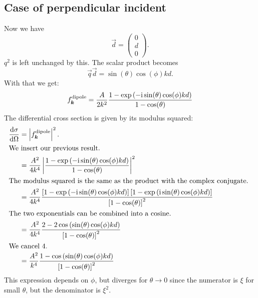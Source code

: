 \documentclass[11pt, english, fleqn, DIV=15, headinclude, BCOR=1.5cm]{scrartcl}
\begin{document}
\subsection{Case of perpendicular incident}

Now we have
\[
    \vec d =
    \begin{pmatrix}
        0 \\ d \\ 0
    \end{pmatrix}.
\]
$q^2$ is left unchanged by this. The scalar product becomes
\[
    \vec q \vec d = \sin(\theta) \cos(\phi) kd.
\]
With that we get:
\[
    f_{\boldsymbol{k}}^\text{dipole} = \frac{A}{2k^2} \frac{1 - \exp\left( -\mathrm i \sin(\theta)
    \cos(\phi) kd \right)}{1 - \cos(\theta)}
\]
The differential cross section is given by its modulus squared:
\begin{align*}
    \od\sigma\Omega
    &= \abs{f_{\vec k}^\text{dipole}}^2. \\
    \intertext{%
        We insert our previous result.
    }
    &= \frac{A^2}{4k^4} \abs{\frac{1 - \exp\del{-\iup \sin(\theta) \cos(\phi)
    kd}}{1 - \cos(\theta)}}^2 \\
    \intertext{%
        The modulus squared is the same as the product with the complex
        conjugate.
    }
    &= \frac{A^2}{4k^4} \frac{\sbr{1 - \exp\del{-\iup \sin(\theta) \cos(\phi)
    kd}}\sbr{1 - \exp\del{\iup \sin(\theta) \cos(\phi)
    kd}}}{\sbr{1 - \cos(\theta)}^2} \\
    \intertext{%
        The  two exponentials can be combined into a cosine.
    }
    &= \frac{A^2}{4k^4} \frac{2 - 2 \cos\del{\sin(\theta) \cos(\phi)
    kd}}{\sbr{1 - \cos(\theta)}^2} \\
    \intertext{%
        We cancel 4.
    }
    &= \frac{A^2}{k^4} \frac{1 - \cos\del{\sin(\theta) \cos(\phi)
    kd}}{\sbr{1 - \cos(\theta)}^2}
\end{align*}
This expression depends on $\phi$, but diverges for $\theta \to 0$ since the
numerator is $\xi$ for small $\theta$, but the denominator is $\xi^2$.
\end{document}
